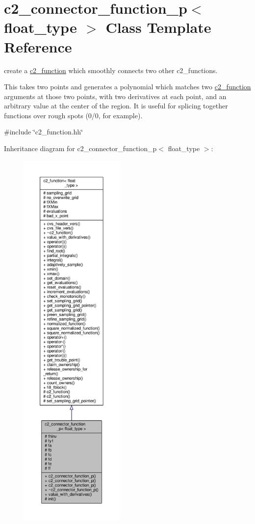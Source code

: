 \hypertarget{classc2__connector__function__p}{}\section{c2\+\_\+connector\+\_\+function\+\_\+p$<$ float\+\_\+type $>$ Class Template Reference}
\label{classc2__connector__function__p}


create a \hyperlink{classc2__function}{c2\+\_\+function} which smoothly connects two other c2\+\_\+functions.

This takes two points and generates a polynomial which matches two \hyperlink{classc2__function}{c2\+\_\+function} arguments at those two points, with two derivatives at each point, and an arbitrary value at the center of the region. It is useful for splicing together functions over rough spots (0/0, for example).  




{\ttfamily \#include \char`\"{}c2\+\_\+function.\+hh\char`\"{}}



Inheritance diagram for c2\+\_\+connector\+\_\+function\+\_\+p$<$ float\+\_\+type $>$\+:
\nopagebreak
\begin{figure}[H]
\begin{center}
\leavevmode
\includegraphics[height=550pt]{classc2__connector__function__p__inherit__graph}
\end{center}
\end{figure}


